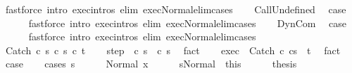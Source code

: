 \begin{isabellebody}
\ {\isacharparenleft}fastforce\ intro{\isacharcolon}\ exec{\isachardot}intros\ elim{\isacharcolon}\ exec{\isacharunderscore}Normal{\isacharunderscore}elim{\isacharunderscore}cases{\isacharparenright}\isanewline
{}\isamarkupfalse%
\isanewline
\ \ \isamarkupfalse%
\ CallUndefined\ \isamarkupfalse%
\ {\isacharquery}case\isanewline
\ \ \ \ \isamarkupfalse%
\ {\isacharparenleft}fastforce\ intro{\isacharcolon}\ exec{\isachardot}intros\ elim{\isacharcolon}\ exec{\isacharunderscore}Normal{\isacharunderscore}elim{\isacharunderscore}cases{\isacharparenright}\isanewline
{}\isamarkupfalse%
\isanewline
\ \ \isamarkupfalse%
\ DynCom\ \isamarkupfalse%
\ {\isacharquery}case\isanewline
\ \ \ \ \isamarkupfalse%
\ {\isacharparenleft}fastforce\ intro{\isacharcolon}\ exec{\isachardot}intros\ elim{\isacharcolon}\ exec{\isacharunderscore}Normal{\isacharunderscore}elim{\isacharunderscore}cases{\isacharparenright}\isanewline
{}\isamarkupfalse%
\isanewline
\ \ \isamarkupfalse%
\ {\isacharparenleft}Catch\ c\ s\ c\ s{\isacharprime}\ c\ t{\isacharparenright}\isanewline
\ \ \isamarkupfalse%
\ step{\isacharcolon}\ {\isachardoublequoteopen}{\isasymGamma}{\isasymturnstile}\ {\isacharparenleft}c\ s{\isacharparenright}\ {\isasymrightarrow}\ {\isacharparenleft}c\ s{\isacharprime}{\isacharparenright}{\isachardoublequoteclose}\ \isamarkupfalse%
\ fact\isanewline
\ \ \isamarkupfalse%
\ exec{\isacharprime}{\isacharcolon}\ {\isachardoublequoteopen}{\isasymGamma}{\isasymturnstile}\ {\isasymlangle}Catch\ c\ cs{\isacharprime}{\isasymrangle}\ {\isasymRightarrow}\ t{\isachardoublequoteclose}\ \isamarkupfalse%
\ fact\isanewline
\ \ \isamarkupfalse%
\ {\isacharquery}case\isanewline
\ \ \isamarkupfalse%
\ {\isacharparenleft}cases\ s{\isacharparenright}\isanewline
\ \ \ \ \isamarkupfalse%
\ {\isacharparenleft}Normal\ x{\isacharparenright}\isanewline
\ \ \ \ \isamarkupfalse%
\ s{\isacharunderscore}Normal\ {\isacharequal}\ this\isanewline
\ \ \ \ \isamarkupfalse%
\ {\isacharquery}thesis\isanewline
\ \ \ \ \isamarkupfalse%

\end{isabellebody}
